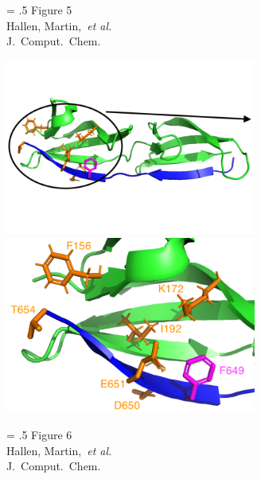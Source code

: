 \begin{center}
\resizebox{\textwidth}{!}
{
	
}
\end{center}
\vspace{0.25in}
\hspace*{3in}
{\Large
\begin{minipage}[t]{3in}
\baselineskip = .5\baselineskip
Figure 5 \\
Hallen, Martin,~\textit{et al.}\\
J.\ Comput.\ Chem.
\end{minipage}
}

\newpage

\begin{center}
\includegraphics[width=3.25in]{figures/python_bbks_full.png}\includegraphics[width=3.25in]{figures/python_bbks_zoom.png}
\end{center}
\vspace{0.25in}
\hspace*{3in}
{\Large
\begin{minipage}[t]{3in}
\baselineskip = .5\baselineskip
Figure 6 \\
Hallen, Martin,~\textit{et al.}\\
J.\ Comput.\ Chem.
\end{minipage}
}

